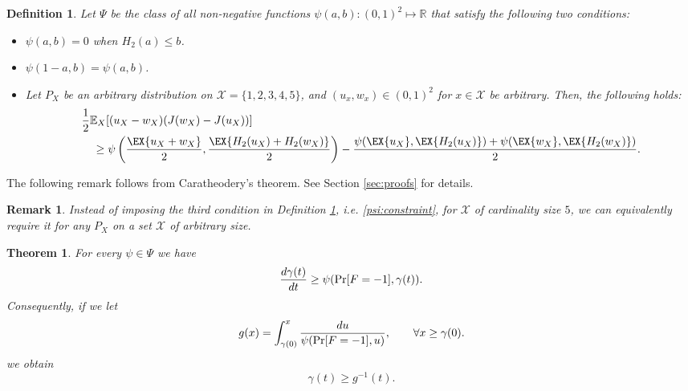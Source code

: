 \documentclass[conference,letterpaper,onecolumn]{IEEEtran}
\theoremstyle{plain}%
\newtheorem{thm}{Theorem}
\newtheorem{definition}{Definition}
\newtheorem{rem}{Remark}
\begin{document}
\begin{definition}\label{def1}Let $\Psi$ be the class of all non-negative functions $\psi(a,b):(0,1)^2\mapsto \mathbb{R}$ that satisfy the following two conditions:
\begin{itemize}
    \item 
    $\psi(a,b)=0$ when $H_2(a)\leq b$. 
    \item $\psi(1-a,b)=\psi(a,b)$.
    \item Let $P_X$ be an arbitrary distribution on $\mathcal{X}=\{1,2,3,4,5\}$, and $(u_x,w_x)\in(0,1)^2$ for $x\in\mathcal{X}$ be arbitrary. Then, the following 
holds:\begin{align}
        \label{psi:constraint}
        &\frac{1}{2}\mathbb{E}_X[(u_X-w_X)(J(w_X) - J(u_X))] \\
        &\quad\geq \psi\left(\frac{\EX{u_X+w_X}}{2},\frac{\EX{H_2(u_X) + H_2(w_X)}}{2}\right)  - \frac{\psi(\EX{u_X},\EX{H_2(u_X)}) + \psi(\EX{w_X},\EX{H_2(w_X)})}{2}.\nonumber
    \end{align}
\end{itemize}
\end{definition}
The following remark follows from Caratheodery's theorem. See Section \ref{sec:proofs} for details.
\begin{rem} Instead of imposing the third condition in Definition \ref{def1}, i.e. \eqref{psi:constraint}, for $\mathcal{X}$ of cardinality size $5$, we can equivalently require it for  any $P_X$ on a set $\mathcal{X}$ of arbitrary size.\label{rem:card} 
\end{rem}


\begin{thm}\label{thm1}
For every $\psi\in\Psi$ we have  \begin{align}\frac{d\gamma(t)}{dt} \geq \psi(\textnormal{Pr}[F=-1],\gamma(t)).\label{eqnGd}\end{align}
Consequently, if we let
$$g(x)=\int_{\gamma(0)}^{x}\frac{du}{\psi(\textnormal{Pr}[F=-1],u)},\qquad \forall x\geq \gamma(0).$$
we obtain
$$\gamma(t)\geq g^{-1}(t).$$
\end{thm}
\end{document}
